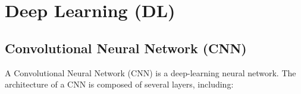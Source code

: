 





\section{Deep Learning (DL)}



\subsection{Convolutional Neural Network (CNN)}

A Convolutional Neural Network (CNN) is a deep-learning neural network. The architecture of a CNN is composed of several layers, including:

